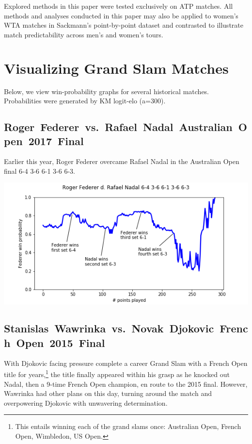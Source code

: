 \documentclass[chapterprefix=false]{report}
\begin{document}

Explored methods in this paper were tested exclusively on ATP matches. All methods and analyses conducted in this paper may also be applied to women's WTA matches in Sackmann's point-by-point dataset and contrasted to illustrate match predictability across men's and women's tours.

\section{Visualizing Grand Slam Matches}

Below, we view win-probability graphs for several historical matches. Probabilities were generated by KM logit-elo (a=300).

\subsection{\mbox{Roger Federer vs. Rafael Nadal Australian Open 2017 Final}}

Earlier this year, Roger Federer overcame Rafael Nadal in the Australian Open final 6-4 3-6 6-1 3-6 6-3.

\includegraphics[scale=.7]{federer_nadal_ao_17}

\subsection{\mbox{Stanislas Wawrinka vs. Novak Djokovic French Open 2015 Final}}

With Djokovic facing pressure complete a career Grand Slam with a French Open title for years,\footnote{This entails winning each of the grand slams once: Australian Open, French Open, Wimbledon, US Open.} the title finally appeared within his grasp as he knocked out Nadal, then a 9-time French Open champion, en route to the 2015 final. However, Wawrinka had other plans on this day, turning around the match and overpowering Djokovic with unwavering determination.
\end{document}
